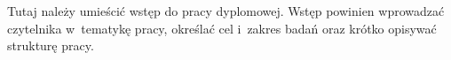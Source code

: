 
Tutaj należy umieścić wstęp do pracy dyplomowej. Wstęp powinien wprowadzać czytelnika
w~tematykę pracy, określać cel i~zakres badań oraz krótko opisywać strukturę pracy.
